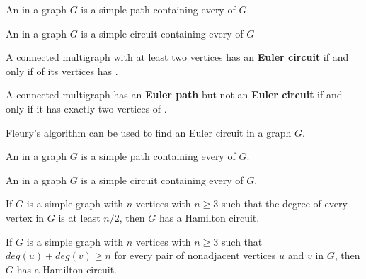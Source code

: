             \par An  in a graph $G$ is a simple path containing every
             of $G$.
            \par An  in a graph $G$ is a simple circuit containing
            every  of $G$ 
            \par A connected multigraph with at least two vertices has an
            \textbf{Euler circuit} if and only if  of its vertices has
            .
            \par A connected multigraph has an \textbf{Euler path} but not an 
            \textbf{Euler circuit} if and only if it has exactly two vertices of
            .
            \par Fleury's algorithm can be used to find an Euler circuit in a graph $G$.
    \hiiEND

            \par An  in a graph $G$ is a simple path containing every
             of $G$.
            \par An  in a graph $G$ is a simple circuit containing
            every  of $G$.
            \par If $G$ is a simple graph with $n$ vertices with $n \geq 3$ such that the
            degree of every vertex in $G$ is at least $n/2$, then $G$ has a Hamilton
            circuit.
            \par If $G$ is a simple graph with $n$ vertices with $n \geq 3$ such that
            $deg(u) + deg(v) \geq n$ for every pair of nonadjacent vertices $u$ and $v$
            in $G$, then $G$ has a Hamilton circuit.
    \hiiEND


